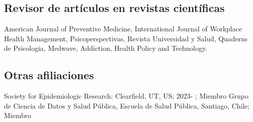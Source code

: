 \documentclass[11pt,a4paper,]{awesome-cv}
\begin{document}
\begin{cventries}
    \vspace{-4.0mm}
    \vspace{-4.0mm}
    \vspace{-4.0mm}
    \vspace{-4.0mm}
\end{cventries}

\hfill \break

\fontsize{10pt}{1.5em}\color{text}

\hypertarget{revisor-de-artuxedculos-en-revistas-cientuxedficas-1}{%
\subsection{Revisor de artículos en revistas
científicas}\label{revisor-de-artuxedculos-en-revistas-cientuxedficas-1}}

\begin{footnotesize}
American Journal of Preventive Medicine, International Journal of Workplace Health Management, Psicoperspectivas, Revista Universidad y Salud, Quaderns de Psicologia, Medwave, Addiction, Health Policy and Technology.
\end{footnotesize}
\fontsize{10pt}{1.5em}\color{text}

\hfill \break

\hypertarget{otras-afiliaciones-1}{%
\subsection{Otras afiliaciones}\label{otras-afiliaciones-1}}

\begin{footnotesize}
Society for Epidemiologic Research: Clearfield, UT, US; 2023- ; Miembro
Grupo de Ciencia de Datos y Salud Pública, Escuela de Salud Pública, Santiago, Chile; Miembro
\end{footnotesize}
\pagebreak

\linebreak
\end{document}
